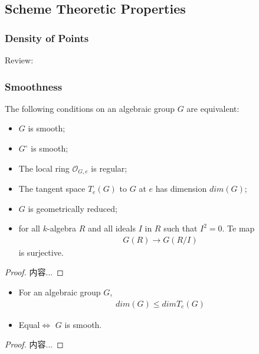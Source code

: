 \documentclass[Total.tex]{subfiles}
\begin{document}
\begin{example}
\begin{gather*rbracketlength=[0.15]}
		\subsection{Scheme Theoretic Properties}
			\subsubsection{Density of Points}
				Review:\begin{Def}
					
				\end{Def}
			\subsubsection{Smoothness}
				\begin{proposition}
					The following conditions on an algebraic group $G$ are equivalent:
					\begin{itemize}
						\item $G$ is smooth;
						\item $G^\circ$ is smooth;
						\item The local ring $\mathcal{O}_{G,e}$ is regular; 
						\item The tangent space $T_e(G)$ to $G$ at $e$ has dimension $dim(G)$;
						\item $G$ is geometrically reduced;
						\item for all $k$-algebra $R$ and all ideals $I$ in $R$ such that $I^2=0$. Te map
						\begin{gather*}
							G(R)\rightarrow G(R/I)
						\end{gather*}
						is surjective.
					\end{itemize}
				\end{proposition}
				\begin{proof}
					内容...
				\end{proof}
				
				\begin{corollary}
					\begin{itemize}
						\item For an algebraic group $G$,
						\begin{gather*}
							dim(G)\leq dim T_e(G)
						\end{gather*}
						\item Equal$\Leftrightarrow$ $G$ is smooth.
					\end{itemize}
				\end{corollary}
				\begin{proof}
					内容...
				\end{proof}

\end{gather*rbracketlength=[0.15]}
\end{example}
\end{document}
